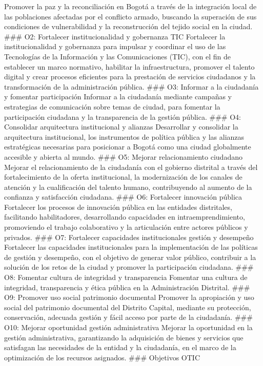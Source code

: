 \documentclass[
	a4paper, %
	12pt, %
]{include/CSSullivanBusinessReport}
\begin{document}
Promover la paz y la reconciliación en Bogotá a través de la integración
local de las poblaciones afectadas por el conflicto armado, buscando la
superación de sus condiciones de vulnerabilidad y la reconstrucción del
tejido social en la ciudad. \#\#\# O2: Fortalecer institucionalidad y
gobernanza TIC Fortalecer la institucionalidad y gobernanza para
impulsar y coordinar el uso de las Tecnologías de la Información y las
Comunicaciones (TIC), con el fin de establecer un marco normativo,
habilitar la infraestructura, promover el talento digital y crear
procesos eficientes para la prestación de servicios ciudadanos y la
transformación de la administración pública. \#\#\# O3: Informar a la
ciudadanía y fomentar participación Informar a la ciudadanía mediante
campañas y estrategias de comunicación sobre temas de ciudad, para
fomentar la participación ciudadana y la transparencia de la gestión
pública. \#\#\# O4: Consolidar arquitectura institucional y alianzas
Desarrollar y consolidar la arquitectura institucional, los instrumentos
de política pública y las alianzas estratégicas necesarias para
posicionar a Bogotá como una ciudad globalmente accesible y abierta al
mundo. \#\#\# O5: Mejorar relacionamiento ciudadano Mejorar el
relacionamiento de la ciudadanía con el gobierno distrital a través del
fortalecimiento de la oferta institucional, la modernización de los
canales de atención y la cualificación del talento humano, contribuyendo
al aumento de la confianza y satisfacción ciudadana. \#\#\# O6:
Fortalecer innovación pública Fortalecer los procesos de innovación
pública en las entidades distritales, facilitando habilitadores,
desarrollando capacidades en intraemprendimiento, promoviendo el trabajo
colaborativo y la articulación entre actores públicos y privados. \#\#\#
O7: Fortalecer capacidades institucionales gestión y desempeño
Fortalecer las capacidades institucionales para la implementación de las
políticas de gestión y desempeño, con el objetivo de generar valor
público, contribuir a la solución de los retos de la ciudad y promover
la participación ciudadana. \#\#\# O8: Fomentar cultura de integridad y
transparencia Fomentar una cultura de integridad, transparencia y ética
pública en la Administración Distrital. \#\#\# O9: Promover uso social
patrimonio documental Promover la apropiación y uso social del
patrimonio documental del Distrito Capital, mediante su protección,
conservación, adecuada gestión y fácil acceso por parte de la
ciudadanía. \#\#\# O10: Mejorar oportunidad gestión administrativa
Mejorar la oportunidad en la gestión administrativa, garantizando la
adquisición de bienes y servicios que satisfagan las necesidades de la
entidad y la ciudadanía, en el marco de la optimización de los recursos
asignados. \#\#\# Objetivos OTIC
\end{document}
